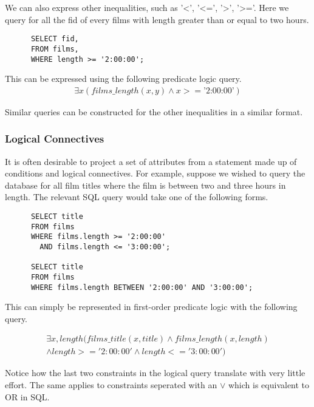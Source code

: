\documentclass[a4paper, 11pt]{article}
\begin{document}

      We can also express other inequalities, such as '<', '<=', '>', '>='.
      Here we query for all the fid of every films with length greater than or
      equal to two hours.

      \begin{verbatim}
      SELECT fid,
      FROM films,
      WHERE length >= '2:00:00';
      \end{verbatim}

      This can be expressed using the following predicate logic query.
      \begin{gather}
        \exists x(films\_length(x, y) \land x >= \text{'2:00:00'}) \label{where5}
      \end{gather}

      Similar queries can be constructed for the other inequalities in a
      similar format.

    \subsubsection{Logical Connectives}

      It is often desirable to project a set of attributes from a statement
      made up of conditions and logical connectives. For example, suppose we
      wished to query the database for all film titles where the film is between 
      two and three hours in length. The relevant SQL query would take one of
      the following forms.

      \begin{verbatim}
      SELECT title
      FROM films
      WHERE films.length >= '2:00:00'
        AND films.length <= '3:00:00';

      SELECT title
      FROM films
      WHERE films.length BETWEEN '2:00:00' AND '3:00:00';
      \end{verbatim}

      This can simply be represented in first-order predicate logic with the
      following query.

      \begin{gather}
        \exists x, length(films\_title(x, title) \land films\_length(x,
        length)\\
        \land length >= '2:00:00' \land length <= '3:00:00')
      \end{gather}

      Notice how the last two constraints in the logical query translate
      with very little effort. The same applies to constraints seperated with
      an $\lor$ which is equivalent to OR in SQL.
\end{document}
